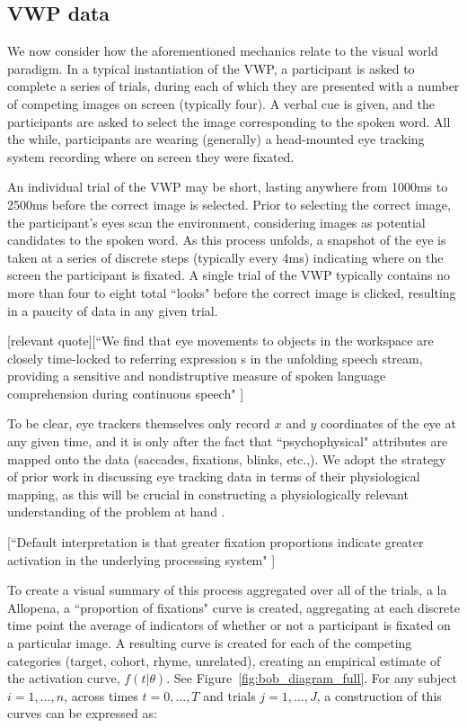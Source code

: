 \documentclass{article}
\begin{document}
\subsection{VWP data}


We now consider how the aforementioned mechanics relate to the visual world paradigm. In a typical instantiation of the VWP, a participant is asked to complete a series of trials, during each of which they are presented with a number of competing images on screen (typically four). A verbal cue is given, and the participants are asked to select the image corresponding to the spoken word. All the while, participants are wearing (generally) a head-mounted eye tracking system recording where on screen they were fixated. 

An individual trial of the VWP may be short, lasting anywhere from 1000ms to 2500ms before the correct image is selected. Prior to selecting the correct image, the participant's eyes scan the environment, considering images as potential candidates to the spoken word. As this process unfolds, a snapshot of the eye is taken at a series of discrete steps (typically every 4ms) indicating where on the screen the participant is fixated. A single trial of the VWP typically contains no more than four to eight total ``looks" before the correct image is clicked, resulting in a paucity of data in any given trial.

[relevant quote][``We find that eye movements to objects in the workspace are closely time-locked to referring expression s in the unfolding speech stream, providing a sensitive and nondistruptive measure of spoken language comprehension during continuous speech" \cite{allopenna1998tracking}]

To be clear, eye trackers themselves only record $x$ and $y$ coordinates of the eye at any given time, and it is only after the fact that ``psychophysical" attributes are mapped onto the data (saccades, fixations, blinks, etc.,). We adopt the strategy of prior work in discussing eye tracking data in terms of their physiological mapping, as this will be crucial in constructing a physiologically relevant understanding of the problem at hand \cite{mcmurray2002look}.

[``Default interpretation is that greater fixation proportions indicate greater activation in the underlying processing system" \cite{Magnuson2019}]


To create a visual summary of this process aggregated over all of the trials, a la Allopena, a ``proportion of fixations" curve is created, aggregating at each discrete time point the average of indicators of whether or not a participant is fixated on a particular image. A resulting curve is created for each of the competing categories (target, cohort, rhyme, unrelated), creating an empirical estimate of the activation curve, $f(t|\theta)$. See Figure~\ref{fig:bob_diagram_full}. For any subject $i = 1, \dots, n$, across times $t = 0, \dots, T$ and trials $j = 1, \dots, J$, a construction  of this curves can be expressed as:
\end{document}

